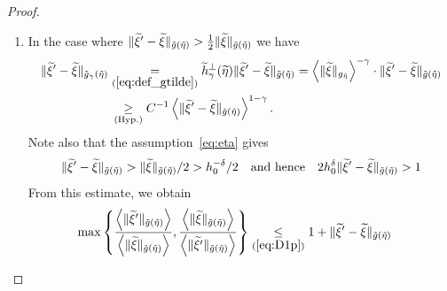 \documentclass[10pt]{amsart}
\theoremstyle{definition}\newtheorem{defi}[theo]{Definition}\newtheorem{rema}[theo]{Remark}\newtheorem{exam}[theo]{Example}\newtheorem{exem}[theo]{Example}\newtheorem{nota}[theo]{Notation}
\newcommand*\eq[1]{\underset{(#1)}{=}}
\newcommand*\ineq[1]{\underset{(#1)}{\leq}}
\let\oldtilde\tilde
\renewcommand*{\tilde}[1]{\mathchoice{\widetilde{#1}}{\widetilde{#1}}{\oldtilde{#1}}{\oldtilde{#1}}}
\begin{document}
\begin{proof}
\begin{enumerate}
\begin{align}\label{eq:log3}
\max\left\{ \frac{\left\langle\|\tilde{\xi}'\|_{\tilde{g}\left(\tilde{\eta}\right)}\right\rangle}{\left\langle\|\tilde{\xi}\|_{\tilde{g}\left(\tilde{\eta}\right)}\right\rangle},\frac{\left\langle\|\tilde{\xi}\|_{\tilde{g}\left(\tilde{\eta}\right)}\right\rangle}{\left\langle\|\tilde{\xi}'\|_{\tilde{g}\left(\tilde{\eta}\right)}\right\rangle}\right\} & \ineq{\ref{eq:*10}}1+2\left\langle\|\tilde{\xi}\|_{\tilde{g}\left(\tilde{\eta}\right)}\right\rangle^{-(1-\gamma)}\|\tilde{\xi}'-\tilde{\xi}\|_{\tilde{g}_{\gamma}\left(\tilde{\eta}\right)}
\\
& \mkern9mu\le1+Ch_{0}^{\mu}\left\langle\|\tilde{\xi}'-\tilde{\xi}\|_{\tilde{g}_{\gamma}\left(\tilde{\eta}\right)}\right\rangle.
\end{align}
where $\mu=\delta(1-\gamma)<1$ because $\langle\|\tilde{\xi}\|_{\tilde{g}(\tilde{\eta})}\rangle^{-(1-\gamma)}\ineq{\ref{eq:eta}}h_{0}^{\delta(1-\gamma)}$.
\item In the case where $\|\tilde{\xi}'-\tilde{\xi}\|_{\tilde{g}(\tilde{\eta})}>\frac{1}{2}\|\tilde{\xi}\|_{\tilde{g}(\tilde{\eta})}$ we have
\begin{align}\label{eq:*5}
\begin{split}
\|\tilde{\xi}'-\tilde{\xi}\|_{\tilde{g}_{\gamma}\left(\tilde{\eta}\right)} & \eq{\ref{eq:def_gtilde}}\tilde{h}_{\gamma}^{\perp}(\tilde{\eta})\|\tilde{\xi}'-\tilde{\xi}\|_{\tilde{g}\left(\tilde{\eta}\right)}=\left\langle\|\tilde{\xi}\|_{g_{\tilde{\eta}}}\right\rangle^{-\gamma}\cdot\|\tilde{\xi}'-\tilde{\xi}\|_{\tilde{g}\left(\tilde{\eta}\right)}\\
& \mkern3mu\underset{(\mathrm{Hyp.})}{\geq}C^{-1}\left\langle\|\tilde{\xi}'-\tilde{\xi}\|_{\tilde{g}\left(\tilde{\eta}\right)}\right\rangle^{1-\gamma}.
\end{split}
\end{align}
Note also that the assumption~\eqref{eq:eta} gives
\begin{equation}
\|\tilde{\xi}'-\tilde{\xi}\|_{\tilde{g}\left(\tilde{\eta}\right)}>\|\tilde{\xi}\|_{\tilde{g}\left(\tilde{\eta}\right)}/2>h_{0}^{-\delta}/2\quad\text{and hence}\quad2h_{0}^{\delta}\|\tilde{\xi}'-\tilde{\xi}\|_{\tilde{g}\left(\tilde{\eta}\right)}>1\label{eq:a}
\end{equation}
From this estimate, we obtain
\begin{equation}\label{log2}
\begin{split}
\max\left\{ \frac{\left\langle\|\tilde{\xi}'\|_{\tilde{g}\left(\tilde{\eta}\right)}\right\rangle}{\left\langle\|\tilde{\xi}\|_{\tilde{g}\left(\tilde{\eta}\right)}\right\rangle},\frac{\left\langle\|\tilde{\xi}\|_{\tilde{g}\left(\tilde{\eta}\right)}\right\rangle}{\left\langle\|\tilde{\xi}'\|_{\tilde{g}\left(\tilde{\eta}\right)}\right\rangle}\right\} & \ineq{\ref{eq:D1p}}1+\|\tilde{\xi}'-\tilde{\xi}\|_{\tilde{g}\left(\tilde{\eta}\right)}

\end{split}
\end{equation}
\end{enumerate}
\end{proof}
\end{document}
